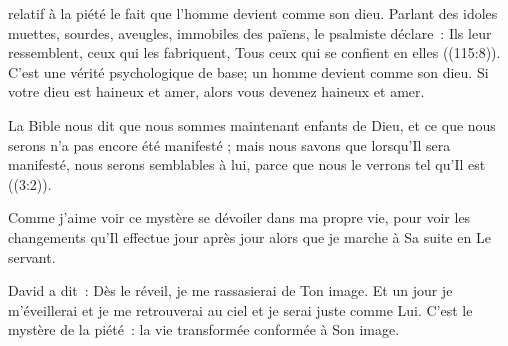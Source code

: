 


 relatif à la piété
 \ocadr le fait que l'homme devient comme son dieu.
 Parlant des idoles muettes, sourdes, aveugles, immobiles des païens,
 le psalmiste déclare~: 
 \og Ils leur ressemblent, ceux qui les fabriquent,
 Tous ceux qui se confient en elles \fg{} ((115:8)).
 C'est une vérité psychologique de base;
 un homme devient comme son dieu.
 Si votre dieu est haineux et amer, alors vous devenez haineux et amer.


La Bible nous dit que \og nous 
 sommes maintenant enfants de Dieu, et ce que nous serons n'a pas encore
 été manifesté ; mais nous savons que lorsqu'Il sera manifesté,
 nous serons semblables à lui, parce que nous le verrons
 tel qu'Il est \fg{} ((3:2)).

Comme j'aime voir ce mystère se dévoiler dans ma propre vie,
 pour voir les changements qu'Il effectue jour après jour
 alors que je marche à Sa suite en Le servant.

David a dit~: 
 \og Dès le réveil, je me rassasierai de Ton image. \fg{}
 Et un jour je m'éveillerai et je me retrouverai au ciel
 et je serai juste comme Lui. C'est le mystère de la piété~:
 la vie transformée conformée à Son image.

\dvrule






